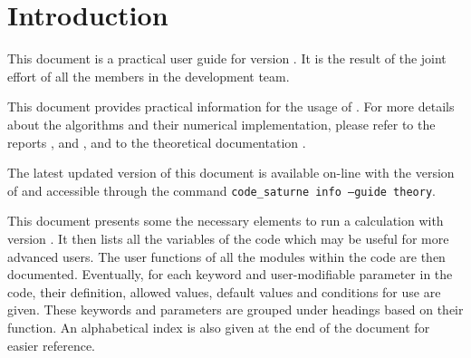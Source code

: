 
%
%
%
%


\nopagebreak
\section{Introduction}

This document is a practical user guide for \CS version \verscs.
It is the result of the joint effort of
all the members in the development team.

This document provides practical information for the usage of \CS.
For more details about the algorithms and their numerical implementation,
please refer to the reports
 \cite{ijvf}, and \cite{mechitoua98},
and to the theoretical documentation \cite{theory}.

The latest updated version of this document is available on-line with the version of \CS
and accessible through the command
\texttt{code\_saturne info --guide theory}.

This document presents some the necessary elements to run a calculation
with \CS version \verscs. It then lists all the variables of the code
which may be useful for more advanced users.
The user functions of all the modules within the code are then documented.
Eventually, for each keyword and user-modifiable parameter in the code,
their definition, allowed values, default values and conditions for use are given.
These keywords and parameters are grouped under headings
based on their function. An alphabetical index is also given at the end of
the document for easier reference.

